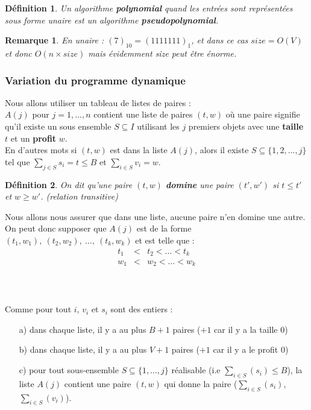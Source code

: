 \documentclass{article}
\newtheorem{de}{D\'efinition}[section]
\newtheorem{rem}{Remarque}[section]
\begin{document}
\begin{sffamily}
\begin{de}
Un algorithme \textbf{polynomial} quand les entrées sont représentées sous forme unaire est un algorithme \textbf{pseudopolynomial}.
\end{de}

\begin{rem}
En unaire : $(7)_{10} = (1111111)_1$, et dans ce cas $size = O(V)$ et donc $O(n\times size)$ mais évidemment size peut être énorme.
\end{rem}

\subsubsection{Variation du programme dynamique}

Nous allons utiliser un tableau de listes de paires : \\
$A(j)$ pour $j = 1,...,n$ contient une liste de paires $(t,w)$ où une paire signifie qu'il existe un sous ensemble $S\subseteq I$ utilisant
les $j$ premiers objets avec une \textbf{taille} $t$ et un \textbf{profit} $w$. \\
En d'autres mots si $(t,w)$ est dans la liste $A(j)$, alors il existe $S\subseteq \{1,2,...,j\}$ tel que $\sum_{j\in S} s_i = t \leq B$ et
$\sum_{i\in S} v_i = w$.

\begin{de}
On dit qu'une paire $(t,w)$ \textbf{domine} une paire $(t',w')$ si $t\leq t'$ et
$w \geq w'$. (relation transitive)
\end{de}

Nous allons nous assurer que dans une liste, aucune paire n'en domine une autre. On peut donc supposer que $A(j)$ est de la forme $(t_1,w_1),
\ (t_2,w_2),\ \ldots ,\ (t_k,w_k)$ et est telle que :
\begin{eqnarray}
\nonumber t_1 & < & t_2 < \ldots < t_k \\
\nonumber w_1 & < & w_2 < \ldots < w_k
\end{eqnarray}
$ $\\
$ $\\
$ $\\

\noindent Comme pour tout $i$, $v_i$ et $s_i$ sont des entiers :
\begin{enumerate}
\item[a)] dans chaque liste, il y a au plus $B+1$ paires ($+1$ car il y a la taille $0$)
\item[b)] dans chaque liste, il y a au plus $V+1$ paires ($+1$ car il y a le profit $0$)
\item[c)] pour tout sous-ensemble $S\subseteq \{1,...,j\}$ réalisable (i.e $\sum_{i\in S}(s_i) \leq B$), la liste $A(j)$ contient une paire
$(t,w)$ qui donne la paire ($\sum_{i\in S}(s_i)$,$\sum_{i\in S}(v_i)$).
\end{enumerate}


\end{sffamily}
\end{document}
